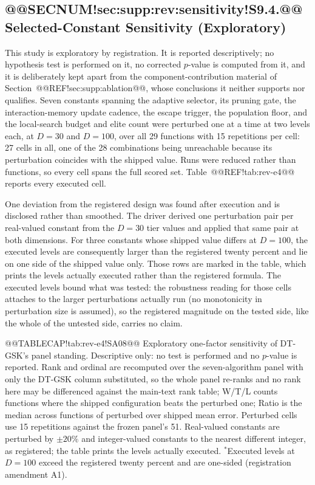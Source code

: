 \documentclass[10pt,a4paper]{article}
\newcommand{\dtgsk}{DT-GSK}
\begin{document}
\subsection{@@SECNUM!sec:supp:rev:sensitivity!S9.4.@@ Selected-Constant Sensitivity (Exploratory)}\label{sec:supp:rev:sensitivity}

This study is exploratory by registration.  It is reported descriptively; no
hypothesis test is performed on it, no corrected $p$-value is computed from it,
and it is deliberately kept apart from the component-contribution material of
Section~@@REF!sec:supp:ablation@@, whose conclusions it neither supports nor
qualifies.  Seven constants spanning the adaptive selector, its pruning gate,
the interaction-memory update cadence,
the escape trigger, the population floor, and the local-search budget and elite
count were perturbed one at a time at two levels each, at $D = 30$ and
$D = 100$, over all 29 functions with 15 repetitions per cell: 27 cells in all,
one of the 28 combinations being unreachable because its perturbation coincides
with the shipped value.  Runs were reduced rather than functions, so every cell
spans the full scored set.  Table~@@REF!tab:rev-e4@@ reports every executed cell.


One deviation from the registered design was found after execution and is
disclosed rather than smoothed.  The driver derived one perturbation pair per
real-valued constant from the $D = 30$ tier values and applied that same pair at
both dimensions.  For three constants whose shipped value differs at $D = 100$,
the executed levels are consequently larger than the registered twenty percent
and lie on one side of the shipped value only.  Those rows are marked in the
table, which prints the levels actually executed rather than the registered
formula.  The executed levels bound what was tested: the robustness reading for those
cells attaches to the larger perturbations actually run (no monotonicity in
perturbation size is assumed), so the registered magnitude on the tested
side, like the whole of the untested side, carries no claim.



@@TABLECAP!tab:rev-e4!SA08@@ Exploratory one-factor sensitivity of \dtgsk{}'s panel standing.
Descriptive only: no test is performed and no $p$-value is reported.  Rank and
ordinal are recomputed over the seven-algorithm panel with only the \dtgsk{}
column substituted, so the whole panel re-ranks and no rank here may be
differenced against the main-text rank table; W/T/L counts functions where the
shipped configuration beats the perturbed one; Ratio is the median across
functions of perturbed over
shipped mean error.  Perturbed cells use 15 repetitions against the frozen
panel's 51.  Real-valued constants are perturbed by $\pm 20\%$ and integer-valued
constants to the nearest different integer, as registered; the table prints the
levels actually executed.  $^{\ast}$Executed levels at $D = 100$ exceed the registered
twenty percent and are one-sided (registration amendment
A1).
\end{document}
